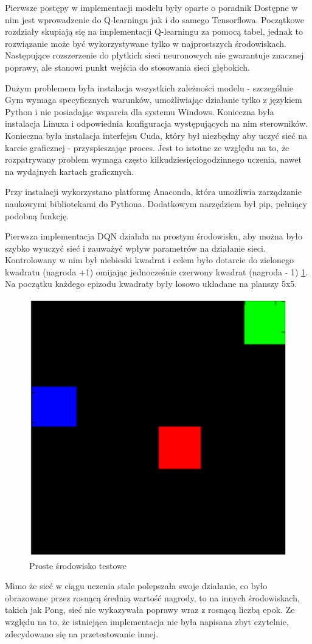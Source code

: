 \documentclass[preprint,12pt]{elsarticle}
\begin{document}
Pierwsze postępy w implementacji modelu były oparte o poradnik \cite{implementation1} Dostępne w nim jest wprowadzenie do Q-learningu jak i do samego Tensorflowa. Początkowe rozdziały skupiają się na implementacji Q-learningu za pomocą tabel, jednak to rozwiązanie może być wykorzystywane tylko w najprostszych środowiskach. Następujące rozszerzenie do płytkich sieci neuronowych nie gwarantuje znacznej poprawy, ale stanowi punkt wejścia do stosowania sieci głębokich.

Dużym problemem była instalacja wszystkich zależności modelu - szczególnie Gym wymaga specyficznych warunków, umożliwiając działanie tylko z językiem Python i nie posiadając wsparcia dla systemu Windows. Konieczna była instalacja Linuxa i odpowiednia konfiguracja występujących na nim sterowników. Konieczna była instalacja interfejsu Cuda, który był niezbędny aby uczyć sieć na karcie graficznej - przyspieszając proces. Jest to istotne ze względu na to, że rozpatrywany problem wymaga często kilkudziesięciogodzinnego uczenia, nawet na wydajnych kartach graficznych. 

Przy instalacji wykorzystano platformę Anaconda, która umożliwia zarządzanie naukowymi bibliotekami do Pythona. Dodatkowym narzędziem był pip, pełniący podobną funkcję. 

Pierwsza implementacja DQN działała na prostym środowisku, aby można było szybko wyuczyć sieć i zauważyć wpływ parametrów na działanie sieci. Kontrolowany w nim był niebieski kwadrat i celem było dotarcie do zielonego kwadratu (nagroda +1) omijając jednocześnie czerwony kwadrat (nagroda - 1) \ref{proste}. Na początku każdego epizodu kwadraty były losowo układane na planszy 5x5.

\begin{figure}[h]
\centering
\includegraphics[width=0.4\linewidth]{testing.png}
\caption{Proste środowisko testowe}
\label{proste}
\end{figure}


Mimo że sieć w ciągu uczenia stale polepszała swoje działanie, co było obrazowane przez rosnącą średnią wartość nagrody, to na innych środowiskach, takich jak Pong, sieć nie wykazywała poprawy wraz z rosnącą liczbą epok. Ze względu na to, że istniejąca implementacja nie była napisana zbyt czytelnie, zdecydowano się na przetestowanie innej.
\end{document}
